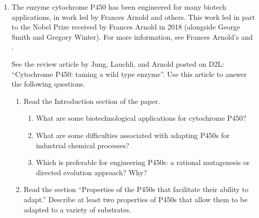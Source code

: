 \documentclass[basic]{inVerba-notes}
\begin{document}
\begin{enumerate}[align=left, leftmargin=0pt, labelindent=\parindent, listparindent=\parindent, labelwidth=0pt, itemindent=!]
  \item The enzyme cytochrome P450 has been engineered for many biotech applications, in work led by Frances Arnold and others. This work led in part to the Nobel Prize received by Frances Arnold in 2018 (alongside George Smith and Gregory Winter). For more information, see Frances Arnold’s  and .
  
  See the review article by Jung, Lauchli, and Arnold posted on 
  D2L: “Cytochrome P450: taming a wild type enzyme”. Use this article to answer the following questions.

  \begin{enumerate}
    \item {} Read the Introduction section of the paper.
    \begin{enumerate}[align=left, leftmargin=0pt, labelindent=\parindent, listparindent=\parindent, labelwidth=0pt, itemindent=!]
      \item What are some biotechnological applications for cytochrome P450?
      \item What are some difficulties associated with adapting P450s for industrial chemical processes?
      \item Which is preferable for engineering P450s: a rational mutagenesis or directed evolution approach? Why?
    \end{enumerate}
    \item {} Read the section “Properties of the P450s that facilitate their ability to adapt.”  Describe at least two properties of P450s that allow them to be adapted to a variety of substrates.
  \end{enumerate}
\end{enumerate}
\end{document}
